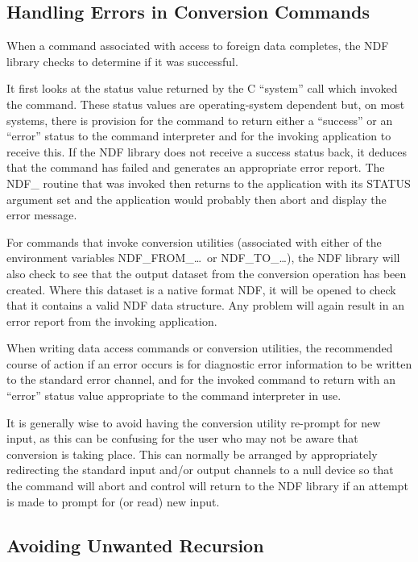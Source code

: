 \documentclass[11pt,twoside,nolof]{starlink}
\begin{document}
\subsection{\label{sect:errors}Handling Errors in Conversion Commands}

When a command associated with access to foreign data completes, the
NDF library checks to determine if it was successful.

It first looks at the status value returned by the C ``system'' call
which invoked the command. These status values are operating-system
dependent but, on most systems, there is provision for the command to
return either a ``success'' or an ``error'' status to the command
interpreter and for the invoking application to receive this.  If the
NDF library does not receive a success status back, it deduces that
the command has failed and generates an appropriate error report. The
NDF\_ routine that was invoked then returns to the application with
its STATUS argument set and the application would probably then abort
and display the error message.

For commands that invoke conversion utilities (associated with either
of the environment variables NDF\_FROM\_\ldots\ or NDF\_TO\_\ldots),
the NDF library will also check to see that the output dataset from
the conversion operation has been created. Where this dataset is a
native format NDF, it will be opened to check that it contains a valid
NDF data structure. Any problem will again result in an error report
from the invoking application.

When writing data access commands or conversion utilities, the
recommended course of action if an error occurs is for diagnostic
error information to be written to the standard error channel, and for
the invoked command to return with an ``error'' status value
appropriate to the command interpreter in use.

It is generally wise to avoid having the conversion utility re-prompt
for new input, as this can be confusing for the user who may not be
aware that conversion is taking place. This can normally be arranged
by appropriately redirecting the standard input and/or output channels
to a null device so that the command will abort and control will
return to the NDF library if an attempt is made to prompt for (or
read) new input.

\subsection{Avoiding Unwanted Recursion}
\end{document}
